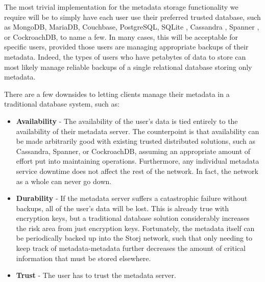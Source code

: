 \documentclass[8pt,fleqn,openany]{book}
\begin{document}
The most trivial implementation for the metadata storage functionality we
require will be to simply have each user use their preferred trusted database,
such as MongoDB, MariaDB, Couchbase, PostgreSQL, SQLite \cite{sqlite},
Cassandra \cite{cassandra}, Spanner \cite{spanner}, or CockroachDB,
to name a few. In many cases, this will
be acceptable for specific users, provided those users are managing appropriate
backups of their metadata. Indeed, the types of users who have petabytes of data
to store can most likely manage reliable backups of a single relational database
storing only metadata.

There are a few downsides to letting clients manage their metadata in a
traditional database system, such as:
\begin{itemize}
\item {\bf Availability} - The availability of the user's data
is tied entirely to the availability of their metadata server. The counterpoint
is that availability can be made arbitrarily good with existing trusted
distributed solutions, such as Cassandra, Spanner, or CockroachDB, assuming an
appropriate amount of effort put into maintaining operations. Furthermore, any
individual metadata service downtime does not affect the rest of the network. In
fact, the network as a whole can never go down.
\item {\bf Durability} -
If the metadata server suffers a catastrophic failure without backups, all of
the user's data will be lost. This is already true with encryption keys,
but a traditional database solution considerably increases the risk area from just
encryption keys. Fortunately, the metadata itself can be periodically backed
up into the Storj network,
such that only needing to keep track of metadata-metadata
further decreases the amount of critical information that must be stored
elsewhere.
\item {\bf Trust} - The user has to trust the metadata server.
\end{itemize}
\end{document}
